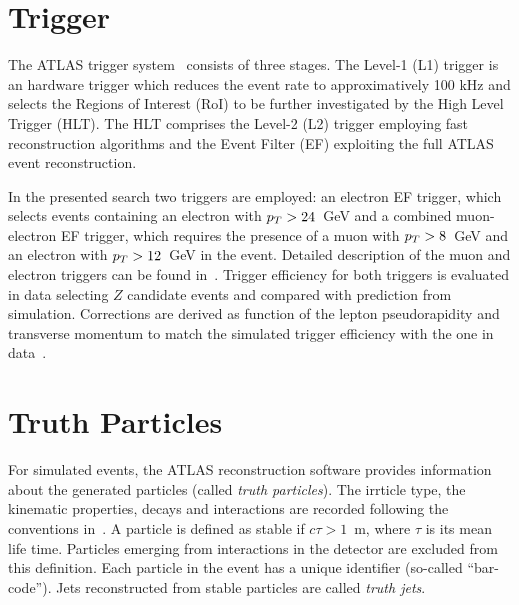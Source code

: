 \section{Trigger}
The ATLAS trigger system~\cite{trigger} consists of three stages. The Level-1 (L1) trigger is an
hardware trigger which reduces the event rate to approximatively 100 kHz and selects the Regions of
Interest (RoI) to be further investigated by the High Level Trigger (HLT). The HLT
comprises the Level-2 (L2) trigger employing fast reconstruction algorithms and the
Event Filter (EF) exploiting the full ATLAS event reconstruction.

In the presented search two triggers are employed: an electron EF trigger, which selects events containing 
an electron with $p_{T} >24 $~GeV and a combined muon-electron EF trigger, which requires the presence of a muon with $p_{T} > 8$~GeV and 
an electron with $p_{T} > 12$~GeV in the event. Detailed description of the muon and electron triggers can be found in~\cite{triggermu,triggere}.
Trigger efficiency for both triggers is evaluated in data selecting $Z$ candidate events and compared with prediction from simulation. Corrections are derived 
as function of the lepton pseudorapidity and transverse  momentum to match the simulated  trigger efficiency 
with the one in  data~\cite{triggermu,triggere}.

\section{Truth Particles}
For simulated events, the ATLAS reconstruction software provides information about the generated 
particles (called \emph{truth particles}). The irrticle type, the kinematic properties, decays and 
interactions are recorded following the conventions  in~\cite{hepmc}.
A particle is defined as stable if $c \tau > 1$~m, where $\tau$ is its mean life time. Particles emerging from 
interactions in the detector are excluded from this definition. 
Each particle in the event has a unique identifier (so-called ``bar-code''). 
Jets reconstructed from stable particles are called \emph{truth jets}.























